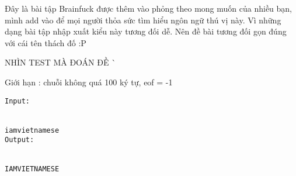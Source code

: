 



   Đây là bài tập Brainfuck được thêm vào phỏng theo mong muốn của nhiều bạn, mình add vào để mọi người thỏa sức tìm hiểu ngôn ngữ thú vị này.  Vì những dạng bài tập nhập xuất kiểu này tương đối dễ. Nên đề bài tương đối gọn đúng với cái tên thách đố :P  

       NHÌN TEST MÀ ĐOÁN ĐỀ ^^     

   Giới hạn : chuỗi không quá 100 ký tự, eof = -1  
\begin{verbatim}
Input:


iamvietnamese
Output:


IAMVIETNAMESE\end{verbatim}
